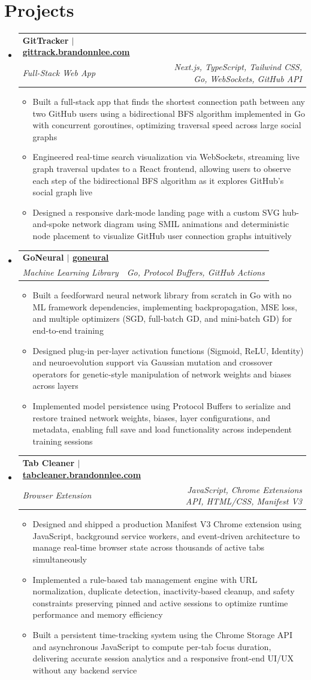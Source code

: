 \documentclass[letterpaper,10pt]{article}
\makeatletter
\newcommand{\resumeItem}[1]{
  \item {\fontsize{8.5}{10}\selectfont #1}
}
\newcommand{\resumeSubheading}[4]{
  \item
  {\fontsize{9.5}{11}\selectfont
  \begin{tabular*}{\textwidth}{l@{\extracolsep{\fill}}r}
    \textbf{#1} & \textbf{#2} \\
    \textit{#3} & \textit{#4}
  \end{tabular*}}
  \vspace{-11pt}
}
\newcommand{\resumeItemListStart}{
  \begin{itemize}[
    leftmargin=0.15in,
    itemsep=0.5pt,
    topsep=0pt,
    parsep=0pt,
    partopsep=0pt
  ]
}
\newcommand{\resumeItemListEnd}{
  \end{itemize}\vspace{-9pt}
}
\newcommand{\resumeSectionStart}{
  \begin{itemize}[
    leftmargin=0in,
    label={},
    itemsep=0pt,
    topsep=0pt,
    parsep=0pt,
    partopsep=0pt
  ]
}
\newcommand{\resumeSectionEnd}{
  \end{itemize}\vspace{-10pt}
}
\makeatother
\begin{document}
\section{Projects}
\resumeSectionStart
  \resumeSubheading
    {GitTracker $|$ \href{https://gittrack.brandonnlee.com/}{\small gittrack.brandonnlee.com}}{}
    {Full-Stack Web App}{Next.js, TypeScript, Tailwind CSS, Go, WebSockets, GitHub API}
  \resumeItemListStart
    \resumeItem{Built a full-stack app that finds the shortest connection path between any two GitHub users using a bidirectional BFS algorithm implemented in Go with concurrent goroutines, optimizing traversal speed across large social graphs}
    \resumeItem{Engineered real-time search visualization via WebSockets, streaming live graph traversal updates to a React frontend, allowing users to observe each step of the bidirectional BFS algorithm as it explores GitHub's social graph live}
    \resumeItem{Designed a responsive dark-mode landing page with a custom SVG hub-and-spoke network diagram using SMIL animations and deterministic node placement to visualize GitHub user connection graphs intuitively}
  \resumeItemListEnd
  \resumeSubheading
    {GoNeural $|$ \href{https://github.com/BrandonKS05/goneural}{\small goneural}}{}
    {Machine Learning Library}{Go, Protocol Buffers, GitHub Actions}
  \resumeItemListStart
    \resumeItem{Built a feedforward neural network library from scratch in Go with no ML framework dependencies, implementing backpropagation, MSE loss, and multiple optimizers (SGD, full-batch GD, and mini-batch GD) for end-to-end training}
    \resumeItem{Designed plug-in per-layer activation functions (Sigmoid, ReLU, Identity) and neuroevolution support via Gaussian mutation and crossover operators for genetic-style manipulation of network weights and biases across layers}
    \resumeItem{Implemented model persistence using Protocol Buffers to serialize and restore trained network weights, biases, layer configurations, and metadata, enabling full save and load functionality across independent training sessions}
  \resumeItemListEnd
  \resumeSubheading
    {Tab Cleaner $|$ \href{https://chromewebstore.google.com/detail/tab-cleaner/oilganhcaffkkibecdfpombhdkgmglcj}{\small tabcleaner.brandonnlee.com}}{}
    {Browser Extension}{JavaScript, Chrome Extensions API, HTML/CSS, Manifest V3}
  \resumeItemListStart
    \resumeItem{Designed and shipped a production Manifest V3 Chrome extension using JavaScript, background service workers, and event-driven architecture to manage real-time browser state across thousands of active tabs simultaneously}
    \resumeItem{Implemented a rule-based tab management engine with URL normalization, duplicate detection, inactivity-based cleanup, and safety constraints preserving pinned and active sessions to optimize runtime performance and memory efficiency}
    \resumeItem{Built a persistent time-tracking system using the Chrome Storage API and asynchronous JavaScript to compute per-tab focus duration, delivering accurate session analytics and a responsive front-end UI/UX without any backend service}
  \resumeItemListEnd
\resumeSectionEnd
\end{document}

